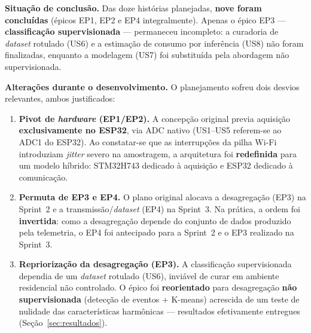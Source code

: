 \documentclass[12pt,a4paper]{article}
\begin{document}

\textbf{Situa\c{c}\~ao de conclus\~ao.} Das doze hist\'orias planejadas, \textbf{nove
foram conclu\'idas} (\'epicos EP1, EP2 e EP4 integralmente). Apenas o \'epico EP3
--- \textbf{classifica\c{c}\~ao supervisionada} --- permaneceu incompleto: a
curadoria de \textit{dataset} rotulado (US6) e a estima\c{c}\~ao de consumo por
infer\^encia (US8) n\~ao foram finalizadas, enquanto a modelagem (US7) foi
substitu\'ida pela abordagem n\~ao supervisionada.

\textbf{Altera\c{c}\~oes durante o desenvolvimento.} O planejamento sofreu dois
desvios relevantes, ambos justificados:

\begin{enumerate}[nosep]
  \item \textbf{Pivot de \textit{hardware} (EP1/EP2).} A concep\c{c}\~ao original
  previa aquisi\c{c}\~ao \textbf{exclusivamente no ESP32}, via ADC nativo (US1--US5
  referem-se ao ADC1 do ESP32). Ao constatar-se que as interrup\c{c}\~oes da pilha
  Wi-Fi introduziam \textit{jitter} severo na amostragem, a arquitetura foi
  \textbf{redefinida} para um modelo h\'ibrido: STM32H743 dedicado \`a aquisi\c{c}\~ao
  e ESP32 dedicado \`a comunica\c{c}\~ao.
  \item \textbf{Permuta de EP3 e EP4.} O plano original alocava a
  desagrega\c{c}\~ao (EP3) na Sprint~2 e a transmiss\~ao/\textit{dataset} (EP4) na
  Sprint~3. Na pr\'atica, a ordem foi \textbf{invertida}: como a desagrega\c{c}\~ao
  depende do conjunto de dados produzido pela telemetria, o EP4 foi antecipado para
  a Sprint~2 e o EP3 realizado na Sprint~3.
  \item \textbf{Repriorização da desagrega\c{c}\~ao (EP3).} A classifica\c{c}\~ao
  supervisionada dependia de um \textit{dataset} rotulado (US6), invi\'avel de
  curar em ambiente residencial n\~ao controlado. O \'epico foi \textbf{reorientado}
  para desagrega\c{c}\~ao \textbf{n\~ao supervisionada} (detec\c{c}\~ao de eventos +
  K-means) acrescida de um teste de nulidade das caracter\'isticas harm\^onicas ---
  resultados efetivamente entregues (Se\c{c}\~ao~\ref{sec:resultados}).
\end{enumerate}

\end{document}
